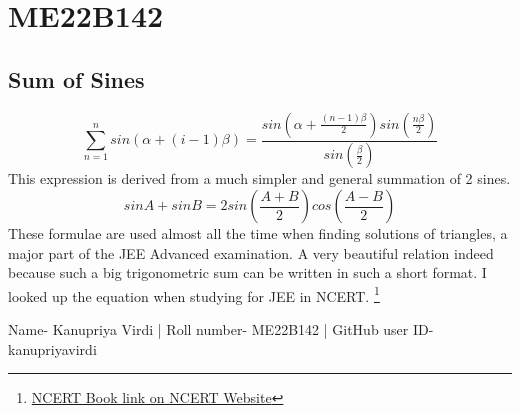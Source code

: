 \section{ME22B142}
\subsection{Sum of Sines}
\begin{equation}
    \sum_{n=1}^{n} sin(\alpha+(i-1)\beta) = \frac{sin(\alpha+\frac{(n-1)\beta}{2})sin(\frac{n\beta}{2})}{sin(\frac{\beta}{2})}
\end{equation}
This expression is derived from a much simpler and general summation of 2 sines.
\begin{equation}
    sinA + sinB = 2sin(\frac{A+B}{2})cos(\frac{A-B}{2})
\end{equation}
These formulae are used almost all the time when finding solutions of triangles, a major part of the JEE Advanced examination. A very beautiful relation indeed because such a big trigonometric sum can be written in such a short format. I looked up the equation when studying for JEE in NCERT. \footnote{\href{https://ncert.nic.in/textbook.php?kemh1=3-16}{NCERT Book link on NCERT Website}}

Name- Kanupriya Virdi | Roll number- ME22B142 | GitHub user ID- kanupriyavirdi